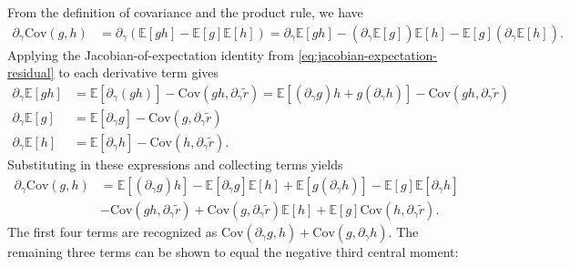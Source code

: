 \documentclass{article}
\begin{document}
From the definition of covariance and the product rule, we have
%
\begin{align}
  \partial_{\gamma} \mathrm{Cov}(g, h) & = \partial_{\gamma} \left( \mathbb{E}[g h] - \mathbb{E}[g]\mathbb{E}[h] \right) = \partial_{\gamma} \mathbb{E}[g h] - (\partial_{\gamma} \mathbb{E}[g]) \mathbb{E}[h] - \mathbb{E}[g] (\partial_{\gamma} \mathbb{E}[h]).
\end{align}
%
Applying the Jacobian-of-expectation identity from \cref{eq:jacobian-expectation-residual} to each derivative term gives
%
\begin{align}
  \partial_{\gamma} \mathbb{E}[g h] & = \mathbb{E}[\partial_{\gamma}(g h)] - \mathrm{Cov}(g h, \partial_{\gamma} \tilde{r}) = \mathbb{E}[(\partial_{\gamma} g) h + g (\partial_{\gamma} h)] - \mathrm{Cov}(g h, \partial_{\gamma} \tilde{r}) \\
  \partial_{\gamma} \mathbb{E}[g]   & = \mathbb{E}[\partial_{\gamma} g] - \mathrm{Cov}(g, \partial_{\gamma} \tilde{r})                                                                                                                       \\
  \partial_{\gamma} \mathbb{E}[h]   & = \mathbb{E}[\partial_{\gamma} h] - \mathrm{Cov}(h, \partial_{\gamma} \tilde{r}).
\end{align}
%
Substituting in these expressions and collecting terms yields
%
\begin{align}
  \partial_{\gamma} \mathrm{Cov}(g, h) & = \mathbb{E}[(\partial_{\gamma} g) h] - \mathbb{E}[\partial_{\gamma} g] \mathbb{E}[h] + \mathbb{E}[g (\partial_{\gamma} h)] - \mathbb{E}[g] \mathbb{E}[\partial_{\gamma} h]           \\
                                       & - \mathrm{Cov}(g h, \partial_{\gamma} \tilde{r}) + \mathrm{Cov}(g, \partial_{\gamma} \tilde{r}) \mathbb{E}[h] + \mathbb{E}[g] \mathrm{Cov}(h, \partial_{\gamma} \tilde{r}). \nonumber
\end{align}
%
The first four terms are recognized as $\mathrm{Cov}(\partial_{\gamma} g, h) + \mathrm{Cov}(g, \partial_{\gamma} h)$.
The remaining three terms can be shown to equal the negative third central moment:
%
\end{document}
